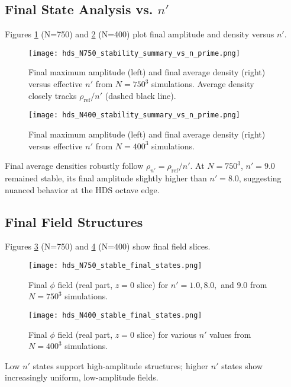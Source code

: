 \documentclass[11pt]{article}
\begin{document}
\subsection{Final State Analysis vs. \(n'\)}
Figures \ref{fig:hds_final_metrics_N750_summary} (N=750) and \ref{fig:hds_final_metrics_N400_summary} (N=400) plot final amplitude and density versus \(n'\).
\begin{figure}[htbp]
    \centering
    \texttt{[image: hds\_N750\_stability\_summary\_vs\_n\_prime.png]}
    \caption{Final maximum amplitude (left) and final average density (right) versus effective \(n'\) from \(N=750^3\) simulations. Average density closely tracks \(\rho_{\text{ref}}/n'\) (dashed black line).}
    \label{fig:hds_final_metrics_N750_summary}
\end{figure}
\begin{figure}[htbp]
    \centering
    \texttt{[image: hds\_N400\_stability\_summary\_vs\_n\_prime.png]}
    \caption{Final maximum amplitude (left) and final average density (right) versus effective \(n'\) from \(N=400^3\) simulations.}
    \label{fig:hds_final_metrics_N400_summary}
\end{figure}
Final average densities robustly follow \(\rho_{n'} = \rho_{\text{ref}}/n'\). At \(N=750^3\), \(n'=9.0\) remained stable, its final amplitude slightly higher than \(n'=8.0\), suggesting nuanced behavior at the HDS octave edge.

\subsection{Final Field Structures}
Figures \ref{fig:hds_final_slices_N750_composite} (N=750) and \ref{fig:hds_final_slices_N400_composite} (N=400) show final field slices.
\begin{figure}[htbp]
    \centering
    \texttt{[image: hds\_N750\_stable\_final\_states.png]} 
    \caption{Final \(\phi\) field (real part, \(z=0\) slice) for \(n'=1.0, 8.0,\) and \(9.0\) from \(N=750^3\) simulations.}
    \label{fig:hds_final_slices_N750_composite}
\end{figure}
\begin{figure}[htbp]
    \centering
    \texttt{[image: hds\_N400\_stable\_final\_states.png]} 
    \caption{Final \(\phi\) field (real part, \(z=0\) slice) for various \(n'\) values from \(N=400^3\) simulations.}
    \label{fig:hds_final_slices_N400_composite}
\end{figure}
Low \(n'\) states support high-amplitude structures; higher \(n'\) states show increasingly uniform, low-amplitude fields.
\end{document}
